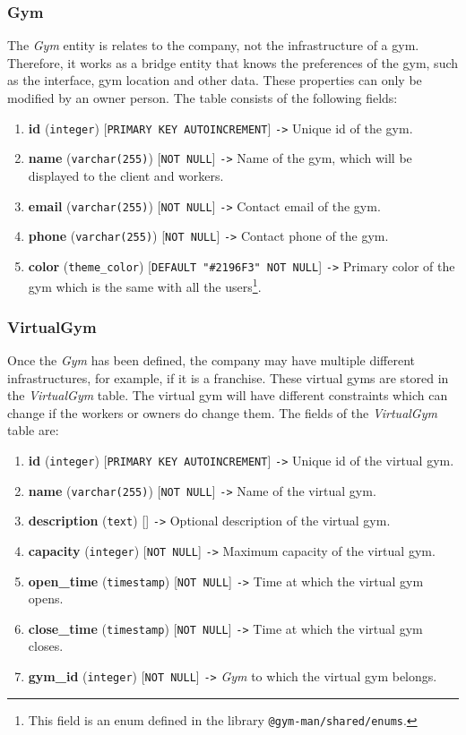 \documentclass[a4paper, 12pt, oneside]{book}
\begin{document}
\subsubsection{Gym}
The \emph{Gym} entity is relates to the company, not the infrastructure of a gym. Therefore, it works as a bridge entity that knows the preferences of the gym, such as the interface, gym location and other data. These properties can only be modified by an owner person. The table consists of the following fields:
\begin{enumerate}[label = -]
	\item \textbf{id} (\texttt{integer}) [\texttt{PRIMARY KEY AUTOINCREMENT}] \texttt{->} Unique id of the gym.
	\item \textbf{name} (\texttt{varchar(255)}) [\texttt{NOT NULL}] \texttt{->} Name of the gym, which will be displayed to the client and workers.
	\item \textbf{email} (\texttt{varchar(255)}) [\texttt{NOT NULL}] \texttt{->} Contact email of the gym.
	\item \textbf{phone} (\texttt{varchar(255)}) [\texttt{NOT NULL}] \texttt{->} Contact phone of the gym.
	\item \textbf{color} (\texttt{theme\_color}) [\texttt{DEFAULT "\#2196F3" NOT NULL}] \texttt{->} Primary color of the gym which is the same with all the users\footnote{This field is an enum defined in the library \texttt{@gym-man/shared/enums}.}.
\end{enumerate}
\subsubsection{VirtualGym}
Once the \emph{Gym} has been defined, the company may have multiple different infrastructures, for example, if it is a franchise. These virtual gyms are stored in the \emph{VirtualGym} table. The virtual gym will have different constraints which can change if the workers or owners do change them. The fields of the \emph{VirtualGym} table are:
\begin{enumerate}[label = -]
	\item \textbf{id} (\texttt{integer}) [\texttt{PRIMARY KEY AUTOINCREMENT}] \texttt{->} Unique id of the virtual gym.
	\item \textbf{name} (\texttt{varchar(255)}) [\texttt{NOT NULL}] \texttt{->} Name of the virtual gym.
	\item \textbf{description} (\texttt{text}) [] \texttt{->} Optional description of the virtual gym.
	\item \textbf{capacity} (\texttt{integer}) [\texttt{NOT NULL}] \texttt{->} Maximum capacity of the virtual gym.
	\item \textbf{open\_time} (\texttt{timestamp}) [\texttt{NOT NULL}] \texttt{->} Time at which the virtual gym opens.
	\item \textbf{close\_time} (\texttt{timestamp}) [\texttt{NOT NULL}] \texttt{->} Time at which the virtual gym closes.
	\item \textbf{gym\_id} (\texttt{integer}) [\texttt{NOT NULL}] \texttt{->} \emph{Gym} to which the virtual gym belongs.
\end{enumerate}
\end{document}
